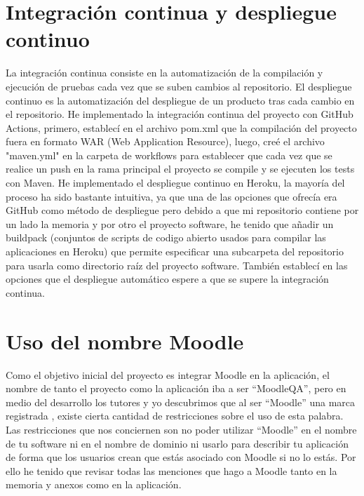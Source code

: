 \section{Integración continua y despliegue continuo}
La integración continua consiste en la automatización de la compilación y ejecución de pruebas cada vez que se suben cambios al repositorio.
El despliegue continuo es la automatización del despliegue de un producto tras cada cambio en el repositorio.
He implementado la integración continua del proyecto con GitHub Actions, primero, establecí en el archivo pom.xml que la compilación del proyecto fuera en formato WAR (Web Application Resource), luego, creé el archivo "maven.yml" en la carpeta de workflows para establecer que cada vez que se realice un push en la rama principal el proyecto se compile y se ejecuten los tests con Maven.
He implementado el despliegue continuo en Heroku, la mayoría del proceso ha sido bastante intuitiva, ya que una de las opciones que ofrecía era GitHub como método de despliegue pero debido a que mi repositorio contiene por un lado la memoria y por otro el proyecto software, he tenido que añadir un buildpack (conjuntos de scripts de codigo abierto usados para compilar las aplicaciones en Heroku) que permite especificar una subcarpeta del repositorio para usarla como directorio raíz del proyecto software. También establecí en las opciones que el despliegue automático espere a que se supere la integración continua.

\section{Uso del nombre Moodle}
Como el objetivo inicial del proyecto es integrar Moodle en la aplicación, el nombre de tanto el proyecto como la aplicación iba a ser ``MoodleQA'', pero en medio del desarrollo los tutores y yo descubrimos que al ser ``Moodle'' una marca registrada \cite{moodletrademark-2022}, existe cierta cantidad de restricciones sobre el uso de esta palabra. Las restricciones que nos conciernen son no poder utilizar ``Moodle'' en el nombre de tu software ni en el nombre de dominio ni usarlo para describir tu aplicación de forma que los usuarios crean que estás asociado con Moodle si no lo estás. Por ello he tenido que revisar todas las menciones que hago a Moodle tanto en la memoria y anexos como en la aplicación.

